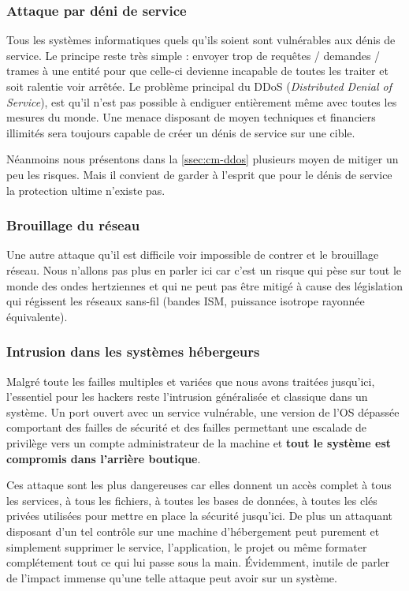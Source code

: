 \documentclass[12pt]{article}
\begin{document}
\subsubsection{Attaque par déni de service}

Tous les systèmes informatiques quels qu'ils soient sont vulnérables aux dénis de service. Le principe reste très simple : envoyer trop de requêtes / demandes / trames à une entité pour que celle-ci devienne incapable de toutes les traiter et soit ralentie voir arrêtée. Le problème principal du DDoS (\emph{Distributed Denial of Service}), est qu'il n'est pas possible à endiguer entièrement même avec toutes les mesures du monde. Une menace disposant de moyen techniques et financiers illimités sera toujours capable de créer un dénis de service sur une cible.

Néanmoins nous présentons dans la \autoref{ssec:cm-ddos} plusieurs moyen de mitiger un peu les risques. Mais il convient de garder à l'esprit que pour le dénis de service la protection ultime n'existe pas.

\subsubsection{Brouillage du réseau}

Une autre attaque qu'il est difficile voir impossible de contrer et le brouillage réseau. Nous n'allons pas plus en parler ici car c'est un risque qui pèse sur tout le monde des ondes hertziennes et qui ne peut pas être mitigé à cause des législation qui régissent les réseaux sans-fil (bandes ISM, puissance isotrope rayonnée équivalente).

\subsubsection{Intrusion dans les systèmes hébergeurs}

Malgré toute les failles multiples et variées que nous avons traitées jusqu'ici, l'essentiel pour les hackers reste l'intrusion généralisée et classique dans un système. Un port ouvert avec un service vulnérable, une version de l'OS dépassée comportant des failles de sécurité et des failles permettant une escalade de privilège vers un compte administrateur de la machine et \textbf{tout le système est compromis dans l'arrière boutique}.

Ces attaque sont les plus dangereuses car elles donnent un accès complet à tous les services, à tous les fichiers, à toutes les bases de données, à toutes les clés privées utilisées pour mettre en place la sécurité jusqu'ici. De plus un attaquant disposant d'un tel contrôle sur une machine d'hébergement peut purement et simplement supprimer le service, l'application, le projet ou même formater complétement tout ce qui lui passe sous la main.  Évidemment, inutile de parler de l'impact immense qu'une telle attaque peut avoir sur un système.
\end{document}
